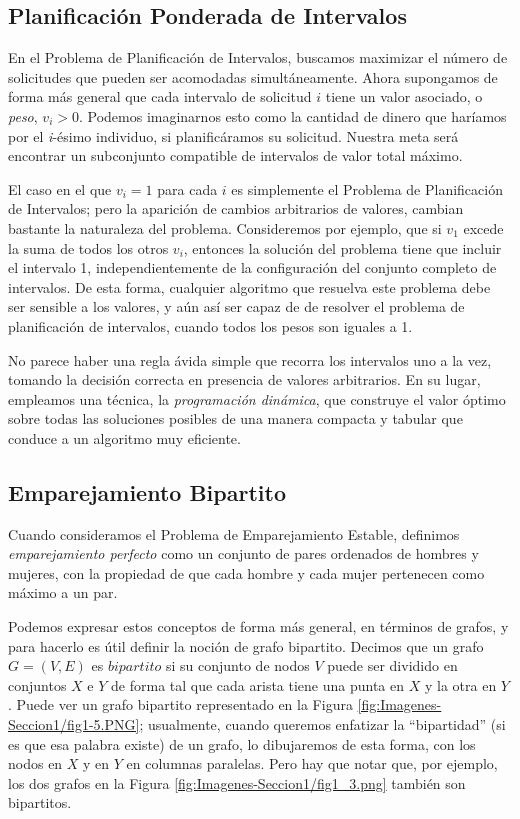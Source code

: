 \documentclass[a4paper, 12pt]{book}
\theoremstyle{dotless}
\begin{document}
\subsection*{Planificación Ponderada de Intervalos}

En el Problema de Planificación de Intervalos, buscamos maximizar el número de solicitudes que pueden ser acomodadas simultáneamente. Ahora supongamos de forma más general que cada intervalo de solicitud $i$ tiene un valor asociado, o \textit{peso}, $v_i > 0$. Podemos imaginarnos esto como la cantidad de dinero que haríamos por el \textit{i}-ésimo individuo, si planificáramos su solicitud. Nuestra meta será encontrar un subconjunto compatible de intervalos de valor total máximo.

El caso en el que $v_i = 1$ para cada $i$ es simplemente el Problema de Planificación de Intervalos; pero la aparición de cambios arbitrarios de valores, cambian bastante la naturaleza del problema. Consideremos por ejemplo, que si $v_1$ excede la suma de todos los otros $v_i$, entonces la solución del problema tiene que incluir el intervalo 1, independientemente de la configuración del conjunto completo de intervalos. De esta forma, cualquier algoritmo que resuelva este problema debe ser sensible a los valores, y aún así ser capaz de de resolver el problema de planificación de intervalos, cuando todos los pesos son iguales a 1.

No parece haber una regla ávida simple que recorra los intervalos uno a la vez, tomando la decisión correcta en presencia de valores arbitrarios.
En su lugar, empleamos una técnica, la \textit{programación dinámica}, que construye el valor óptimo sobre todas las soluciones posibles de una manera compacta y tabular que conduce a un algoritmo muy eficiente.

\subsection*{Emparejamiento Bipartito}

Cuando consideramos el Problema de Emparejamiento Estable, definimos \textit{emparejamiento perfecto} como un conjunto de pares ordenados de hombres y mujeres, con la propiedad de que cada hombre y cada mujer pertenecen como máximo a un par.

Podemos expresar estos conceptos de forma más general, en términos de grafos, y para hacerlo es útil definir la noción de grafo bipartito. Decimos que un grafo $G = (V,E)$ es $bipartito$ si su conjunto de nodos $V$ puede ser dividido en conjuntos $X$ e $Y$ de forma tal que cada arista tiene una punta en $X$ y la otra en $Y$. Puede ver un grafo bipartito representado en la Figura \ref{fig:Imagenes-Seccion1/fig1-5.PNG}; usualmente, cuando queremos enfatizar la ``bipartidad'' (si es que esa palabra existe) de un grafo, lo dibujaremos de esta forma, con los nodos en $X$ y en $Y$ en columnas paralelas. Pero hay que notar que, por ejemplo, los dos grafos en la Figura \ref{fig:Imagenes-Seccion1/fig1_3.png} también son bipartitos.
\end{document}
